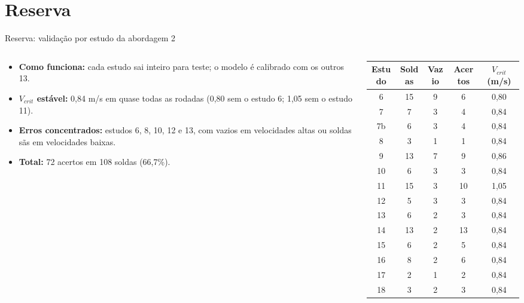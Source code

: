 \documentclass[aspectratio=169,11pt]{beamer}
\newenvironment{bullets}{\begin{itemize}\setlength{\itemsep}{5pt}}{\end{itemize}}
\begin{document}
\section{Reserva}
\begin{frame}{Reserva: validação por estudo da abordagem 2}
\begin{columns}[T,onlytextwidth]
\begin{column}{0.45\textwidth}
\begin{bullets}
  \item \textbf{Como funciona:} cada estudo sai inteiro para teste; o modelo é calibrado com os outros 13.
  \item \textbf{$V_{crit}$ estável:} 0,84 m/s em quase todas as rodadas (0,80 sem o estudo 6; 1,05 sem o estudo 11).
  \item \textbf{Erros concentrados:} estudos 6, 8, 10, 12 e 13, com vazios em velocidades altas ou soldas sãs em velocidades baixas.
  \item \textbf{Total:} 72 acertos em 108 soldas (66,7\%).
\end{bullets}
\end{column}
\begin{column}{0.52\textwidth}
\centering\scriptsize\setlength{\tabcolsep}{4pt}\renewcommand{\arraystretch}{0.9}
\begin{tabular}{ccccc}
\toprule
\textbf{Estudo} & \textbf{Soldas} & \textbf{Vazio} & \textbf{Acertos} & \textbf{$V_{crit}$ (m/s)} \\ \midrule
6 & 15 & 9 & 6 & 0,80 \\
7 & 7 & 3 & 4 & 0,84 \\
7b & 6 & 3 & 4 & 0,84 \\
8 & 3 & 1 & 1 & 0,84 \\
9 & 13 & 7 & 9 & 0,86 \\
10 & 6 & 3 & 3 & 0,84 \\
11 & 15 & 3 & 10 & 1,05 \\
12 & 5 & 3 & 3 & 0,84 \\
13 & 6 & 2 & 3 & 0,84 \\
14 & 13 & 2 & 13 & 0,84 \\
15 & 6 & 2 & 5 & 0,84 \\
16 & 8 & 2 & 6 & 0,84 \\
17 & 2 & 1 & 2 & 0,84 \\
18 & 3 & 2 & 3 & 0,84 \\ \bottomrule
\end{tabular}
\end{column}
\end{columns}
\end{frame}
\end{document}
